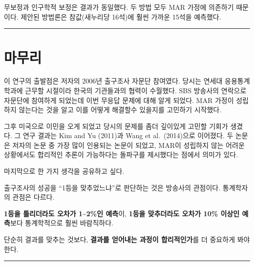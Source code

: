 \documentclass[
  letterpaper,
  DIV=11,
  numbers=noendperiod]{scrreprt}
\begin{document}
무보정과 인구학적 보정은 결과가 동일했다. 두 방법 모두 MAR 가정에
의존하기 때문이다. 제안된 방법론은 참값(새누리당 16석)에 훨씬 가까운
15석을 예측했다.

\begin{center}\rule{0.5\linewidth}{0.5pt}\end{center}

\section{마무리}\label{uxb9c8uxbb34uxb9ac}

이 연구의 출발점은 저자의 2006년 출구조사 자문단 참여였다. 당시는 연세대
응용통계학과에 근무할 시절이라 한국의 기관들과의 협력이 수월했다. SBS
방송사의 연락으로 자문단에 참여하게 되었는데 이번 무응답 문제에 대해
알게 되었다. MAR 가정이 성립하지 않는다는 것을 알고 이를 어떻게 해결할수
있을지를 고민하기 시작했다.

그후 미국으로 이민을 오게 되었고 당시의 문제를 좀더 깊이있게 고민할
기회가 생겼다. 그 연구 결과는 Kim and Yu (2011)과 Wang et al.~(2014)으로
이어졌다. 두 논문은 저자의 논문 중 가장 많이 인용되는 논문이 되었고,
MAR이 성립하지 않는 어려운 상황에서도 합리적인 추론이 가능하다는
돌파구를 제시했다는 점에서 의미가 있다.

마지막으로 한 가지 생각을 공유하고 싶다.

출구조사의 성공을 ``1등을 맞추었느냐''로 판단하는 것은 방송사의
관점이다. 통계학자의 관점은 다르다.

\begin{tcolorbox}[enhanced jigsaw, arc=.35mm, bottomrule=.15mm, bottomtitle=1mm, breakable, colback=white, colbacktitle=quarto-callout-tip-color!10!white, colframe=quarto-callout-tip-color-frame, coltitle=black, left=2mm, leftrule=.75mm, opacityback=0, opacitybacktitle=0.6, rightrule=.15mm, title=\textcolor{quarto-callout-tip-color}{\faLightbulb}\hspace{0.5em}{통계학자의 관점}, titlerule=0mm, toprule=.15mm, toptitle=1mm]

\textbf{1등을 틀리더라도 오차가 1\textasciitilde2\%인 예측}이,
\textbf{1등을 맞추더라도 오차가 10\% 이상인 예측}보다 통계학적으로 훨씬
바람직하다.

단순히 결과를 맞추는 것보다, \textbf{결과를 얻어내는 과정이
합리적인가}를 더 중요하게 봐야 한다.

\end{tcolorbox}

\begin{center}\rule{0.5\linewidth}{0.5pt}\end{center}
\end{document}
